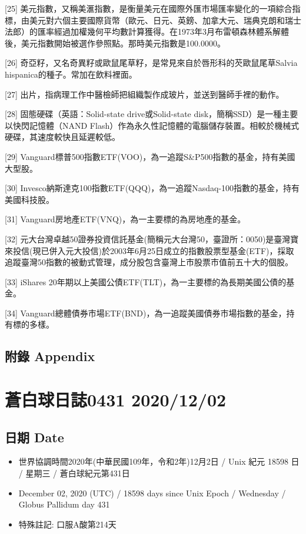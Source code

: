 \documentclass[a5paper, 10pt
]{book}
\providecommand{\tightlist}{%
  \setlength{\itemsep}{0pt}\setlength{\parskip}{0pt}}
\begin{document}
{[}25{]}
美元指數，又稱美滙指數，是衡量美元在國際外匯市場匯率變化的一項綜合指標，由美元對六個主要國際貨幣（歐元、日元、英鎊、加拿大元、瑞典克朗和瑞士法郎）的匯率經過加權幾何平均數計算獲得。在1973年3月布雷頓森林體系解體後，美元指數開始被選作參照點。那時美元指數是100.0000。

{[}26{]}
奇亞籽，又名奇異籽或歐鼠尾草籽，是常見來自於唇形科的芡歐鼠尾草Salvia
hispanica的種子。常加在飲料裡面。

{[}27{]}
出片，指病理工作中醫檢師把組織製作成玻片，並送到醫師手裡的動作。

{[}28{]} 固態硬碟（英語：Solid-state drive或Solid-state
disk，簡稱SSD）是一種主要以快閃記憶體（NAND
Flash）作為永久性記憶體的電腦儲存裝置。相較於機械式硬碟，其速度較快且延遲較低。

{[}29{]}
Vanguard標普500指數ETF(VOO)，為一追蹤S\&P500指數的基金，持有美國大型股。

{[}30{]}
Invesco納斯達克100指數ETF(QQQ)，為一追蹤Nasdaq-100指數的基金，持有美國科技股。

{[}31{]} Vanguard房地產ETF(VNQ)，為一主要標的為房地產的基金。

{[}32{]}
元大台灣卓越50證券投資信託基金(簡稱元大台灣50，臺證所：0050)是臺灣寶來投信(現已併入元大投信)於2003年6月25日成立的指數股票型基金(ETF)，採取追蹤臺灣50指數的被動式管理，成分股包含臺灣上市股票市值前五十大的個股。

{[}33{]} iShares
20年期以上美國公債ETF(TLT)，為一主要標的為長期美國公債的基金。

{[}34{]}
Vanguard總體債券市場ETF(BND)，為一追蹤美國債券市場指數的基金，持有標的多樣。

\hypertarget{ux9644ux9304-appendix}{%
\subsection{附錄 Appendix}\label{ux9644ux9304-appendix}}

\hypertarget{ux84bcux767dux7403ux65e5ux8a8c0431-20201202}{%
\section{蒼白球日誌0431
2020/12/02}\label{ux84bcux767dux7403ux65e5ux8a8c0431-20201202}}

\hypertarget{ux65e5ux671f-date-1}{%
\subsection{日期 Date}\label{ux65e5ux671f-date-1}}

\begin{itemize}
\tightlist
\item
  世界協調時間2020年(中華民國109年，令和2年)12月2日 / Unix 紀元 18598 日
  / 星期三 / 蒼白球紀元第431日
\item
  December 02, 2020 (UTC) / 18598 days since Unix Epoch / Wednesday /
  Globus Pallidum day 431
\item
  特殊註記: 口服A酸第214天
\end{itemize}
\end{document}
